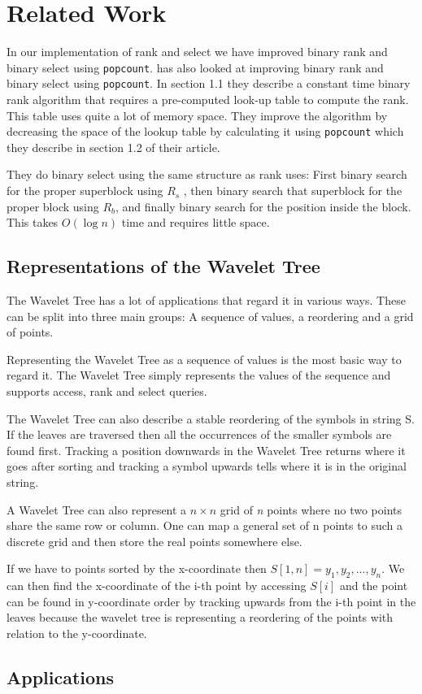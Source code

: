 \section{Related Work}
In our implementation of rank and select we have improved binary rank and binary select using \texttt{popcount}.
\cite{Gonzalez05practicalimplementation} has also looked at improving binary rank and binary select using \texttt{popcount}. 
In section 1.1 they describe a constant time binary rank algorithm that requires a pre-computed look-up table to compute the rank. 
This table uses quite a lot of memory space. 
They improve the algorithm by decreasing the space of the lookup table by calculating it using \texttt{popcount} which they describe in section 1.2 of their article. 

They do binary select using the same structure as rank uses: First binary search for the proper superblock using $R_s$ , then binary search that superblock for the proper block using $R_b$, and finally binary search for the position inside the block. 
This takes $O(\log n)$ time and requires little space.

\subsection{Representations of the Wavelet Tree}
The Wavelet Tree has a lot of applications that regard it in various ways.
These can be split into three main groups: A sequence of values, a reordering and a grid of points.

Representing the Wavelet Tree as a sequence of values is the most basic way to regard it. 
The Wavelet Tree simply represents the values of the sequence and supports access, rank and select queries.

The Wavelet Tree can also describe a stable reordering of the symbols in string S. 
If the leaves are traversed then all the occurrences of the smaller symbols are found first. 
Tracking a position downwards in the Wavelet Tree returns where it goes after sorting and tracking a symbol upwards tells where it is in the original string. 

A Wavelet Tree can also represent a $n \times n$ grid of \textit{n} points where no two points share the same row or column. 
One can map a general set of n points to such a discrete grid and then store the real points somewhere else.

If we have to points sorted by the x-coordinate then $S[1,n] = y_1,y_2,...,y_n$.
We can then find the x-coordinate of the i-th point by accessing $S[i]$ and the point can be found in y-coordinate order by tracking upwards from the i-th point in the leaves because the wavelet tree is representing a reordering of the points with relation to the y-coordinate.

\subsection{Applications}
